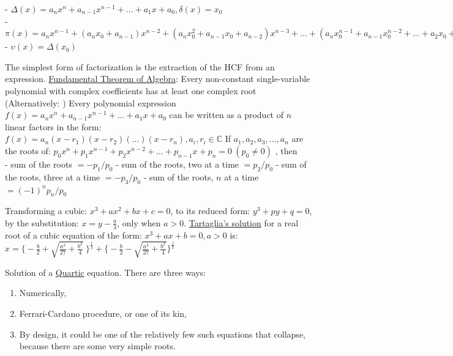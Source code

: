 \documentclass[12pt]{article}
\begin{document}
\begin{flushleft}
	- $\displaystyle \Delta(x) = a_n x^n + a_{n-1} x^{n-1} + \ldots + a_1 x + a_0, \delta(x) = x_0 $ \\ 
	- $\displaystyle \pi(x) = a_n x^{n-1} + (a_n x_0 + a_{n-1}) x^{n-2} + (a_n x_0 ^2 + a_{n-1} x_0 + a_{n-2} ) x^{n-3} + \ldots + (a_n x_0 ^{n-1} + a_{n-1} x_0 ^{n-2} + \ldots + a_2 x_0 + a_1 ) $ \\ 
	- $\displaystyle \upsilon(x) = \Delta (x_0) $ \linebreak 
	
	\textbullet \quad The simplest form of factorization is the extraction of the HCF from an expression. \linebreak
	\textbullet \quad \uline{Fundamental Theorem of Algebra}: Every non-constant single-variable polynomial with complex coefficients has at least one complex root (Alternatively: ) Every polynomial expression $\displaystyle  f(x) = a_n x^n + a_{n-1} x^{n-1} + \ldots + a_1 x + a_0 $ can be written as a product of $ n $ linear factors in the form: $\displaystyle  f(x) = a_n (x - r_1)(x-r_2)(\ldots)(x-r_n), a_i, r_i \in \mathbb{C} $ \linebreak 
	\textbullet \quad If $a_1, a_2, a_3, \ldots, a_n $ are the roots of: $\displaystyle  p_0 x^n + p_1 x^{n-1} + p_2 x^{n-2} + \ldots + p_{n-1} x+ p_n = 0 \ (p_0 \neq 0)$ , then \\ 
	- sum of the roots $ = -p_1 / p_0 $ \linebreak 
	- sum of the roots, two at a time $ = p_2 / p_0 $ \linebreak 
	- sum of the roots, three at a time $ = -p_3 / p_0 $ \linebreak 
	- sum of the roots, $n$ at a time $ = (-1)^n p_n / p_0 $ \linebreak 	
	
	\textbullet \quad Transforming a cubic: $\displaystyle  x^3 + a x^2 + b x + c = 0 $, to its reduced form: $\displaystyle  y^3 + p y + q = 0 $, by the substitution: $\displaystyle  x = y - \frac{a}{3} $, only when $ a> 0 $. \linebreak
	\textbullet \quad \uline{Tartaglia's solution} for a real root of a cubic equation of the form: $\displaystyle  x^3 + ax + b = 0, a > 0 $ is: \\ 
	$\displaystyle x = \Bigg\{ -\frac{b}{2} + \sqrt{\frac{a^3}{27} + \frac{b^2}{4}}\ \Bigg\}^{\frac{1}{3}} + \Bigg\{-\frac{b}{2} - \sqrt{\frac{a^3}{27} + \frac{b^2}{4}} \Bigg\}^{ \frac{1}{3}}  $ \linebreak	
	
	\textbullet \quad Solution of a \uline{Quartic} equation. There are three ways:  
	\begin{enumerate}
	\item Numerically, 
	\item Ferrari-Cardano procedure, or one of its kin, 
	\item By design, it could be one of the relatively few such equations that collapse, because there are some very simple roots. 
	\end{enumerate}
	

\end{flushleft}
\end{document}

